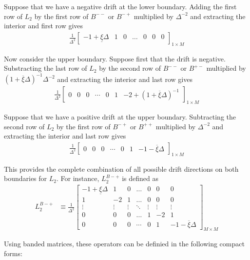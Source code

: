 \documentclass[11pt]{article}
\theoremstyle{definition}
\begin{document}
Suppose that we have a negative drift at the lower boundary. Adding the first row of $L_2$ by the first row of $B^{--}$ or $B^{-+}$ multiplied by $\Delta^{-2}$ and extracting the interior and first row gives
\begin{align}
\frac{1}{\Delta^2}\begin{bmatrix}
-1 + \underline{\xi}\Delta &1&0&\dots&0&0&0
\end{bmatrix}_{1\times M}
\end{align}

Now consider the upper boundary. Suppose first that the drift is negative. Substracting the last row of $L_2$ by the second row of $B^{--}$ or $B^{+-}$ multiplied by $(1 + \overline{\xi} \Delta)^{-1} \Delta^{-2}$ and extracting the interior and last row gives 
\begin{align}
\frac{1}{\Delta^2}\begin{bmatrix}
0&0&0&\cdots&0&1&-2 +(1+ \overline{\xi}\Delta)^{-1}
\end{bmatrix}_{1\times M}
\end{align}

Suppose that we have a positive drift at the upper boundary. Subtracting the second row of $L_2$ by the first row of $B^{-+}$ or $B^{++}$ multiplied by $\Delta^{-2}$ and extracting the interior and last row gives
\begin{align}
\frac{1}{\Delta^2}\begin{bmatrix}
0&0&0&\cdots&0&1&-1 - \overline{\xi}\Delta
\end{bmatrix}_{1\times M}
\end{align}

This provides the complete combination of all possible drift directions on both boundaries for $L_2$. For instance, $L_2^{B-+}$ is defined as
\begin{align}
L_2^{B-+} &\equiv \frac{1}{\Delta^2}\begin{bmatrix}
-1 + \underline{\xi}\Delta &1&0&\dots&0&0&0\\
1&-2&1&\dots&0&0&0\\
\vdots&\vdots&\vdots&\ddots&\vdots&\vdots&\vdots\\
0&0&0&\dots&1&-2&1\\
0&0&0&\cdots&0&1&-1 - \overline{\xi}\Delta
\end{bmatrix}_{M\times M}
\end{align}

Using banded matrices, these operators can be definied in the following compact forms:
\end{document}
